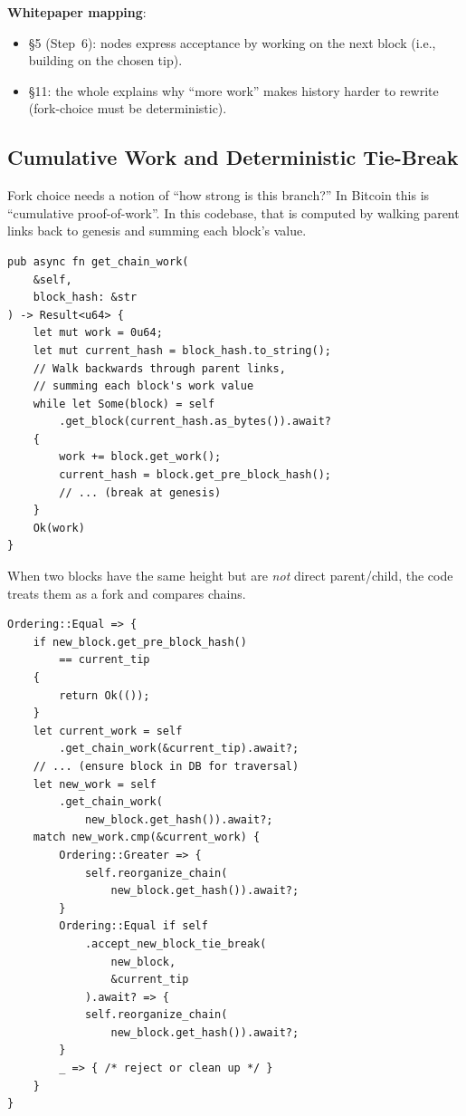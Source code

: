 \textbf{Whitepaper mapping}:
\begin{itemize}
  \item \S5 (Step~6): nodes express acceptance by working on the next block (i.e., building on the chosen tip).
  \item \S11: the whole explains why ``more work'' makes history harder to rewrite (fork-choice must be deterministic).
\end{itemize}

\subsection{Cumulative Work and Deterministic Tie-Break}
\label{sec:ch09-7-work}

Fork choice needs a notion of ``how strong is this branch?'' In Bitcoin this is ``cumulative proof-of-work''. In this codebase, that is computed by walking parent links back to genesis and summing each block's  value.

\begin{listing}[htbp]
\caption{Cumulative chain work ()}
\label{lst:9-7-7}
\begin{verbatim}
pub async fn get_chain_work(
    &self,
    block_hash: &str
) -> Result<u64> {
    let mut work = 0u64;
    let mut current_hash = block_hash.to_string();
    // Walk backwards through parent links,
    // summing each block's work value
    while let Some(block) = self
        .get_block(current_hash.as_bytes()).await?
    {
        work += block.get_work();
        current_hash = block.get_pre_block_hash();
        // ... (break at genesis)
    }
    Ok(work)
}
\end{verbatim}
\end{listing}

When two blocks have the same height but are \emph{not} direct parent/child, the code treats them as a fork and compares chains.

\begin{listing}[htbp]
\caption{Equal-height competitors (compute work, then reorganize or reject)}
\label{lst:9-7-8}
\begin{verbatim}
Ordering::Equal => {
    if new_block.get_pre_block_hash()
        == current_tip
    {
        return Ok(());
    }
    let current_work = self
        .get_chain_work(&current_tip).await?;
    // ... (ensure block in DB for traversal)
    let new_work = self
        .get_chain_work(
            new_block.get_hash()).await?;
    match new_work.cmp(&current_work) {
        Ordering::Greater => {
            self.reorganize_chain(
                new_block.get_hash()).await?;
        }
        Ordering::Equal if self
            .accept_new_block_tie_break(
                new_block,
                &current_tip
            ).await? => {
            self.reorganize_chain(
                new_block.get_hash()).await?;
        }
        _ => { /* reject or clean up */ }
    }
}
\end{verbatim}
\end{listing}

